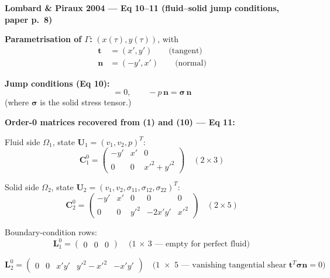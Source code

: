 \textbf{Lombard \& Piraux 2004 --- Eq 10--11 (fluid--solid jump conditions, paper p.\ 8)}

\textbf{Parametrisation of $\Gamma$:} $(x(\tau), y(\tau))$, with
\begin{align*}
  \boldsymbol{t} &= (x', y') \qquad \text{(tangent)} \\
  \boldsymbol{n} &= (-y', x') \qquad \text{(normal)}
\end{align*}

\textbf{Jump conditions (Eq 10):}
\begin{equation*}
  [\boldsymbol{v} \cdot \boldsymbol{n}] = 0, \qquad
  -p \, \boldsymbol{n} = \boldsymbol{\sigma} \, \boldsymbol{n}
\end{equation*}
(where $\boldsymbol{\sigma}$ is the solid stress tensor.)

\textbf{Order-0 matrices recovered from (1) and (10) --- Eq 11:}

\medskip
{\small Fluid side $\Omega_1$, state $\boldsymbol{U}_1 = (v_1, v_2, p)^T$:}
\begin{equation*}
  \boldsymbol{C}_1^0 =
  \begin{pmatrix}
    -y' & x' & 0 \\
    0 & 0 & x'^2 + y'^2
  \end{pmatrix}
  \quad (2 \times 3)
\end{equation*}

{\small Solid side $\Omega_2$, state $\boldsymbol{U}_2 = (v_1, v_2, \sigma_{11}, \sigma_{12}, \sigma_{22})^T$:}
\begin{equation*}
  \boldsymbol{C}_2^0 =
  \begin{pmatrix}
    -y' & x' & 0 & 0 & 0 \\
    0 & 0 & y'^2 & -2x'y' & x'^2
  \end{pmatrix}
  \quad (2 \times 5)
\end{equation*}

{\small Boundary-condition rows:}
\begin{equation*}
  \boldsymbol{L}_1^0 =
  \begin{pmatrix} 0 & 0 & 0 \end{pmatrix}
  \quad \text{(1 $\times$ 3 --- empty for perfect fluid)}
\end{equation*}

\begin{equation*}
  \boldsymbol{L}_2^0 =
  \begin{pmatrix} 0 & 0 & x'y' & y'^2 - x'^2 & -x'y' \end{pmatrix}
  \quad \text{(1 $\times$ 5 --- vanishing tangential shear $\boldsymbol{t}^T \boldsymbol{\sigma} \boldsymbol{n} = 0$)}
\end{equation*}

